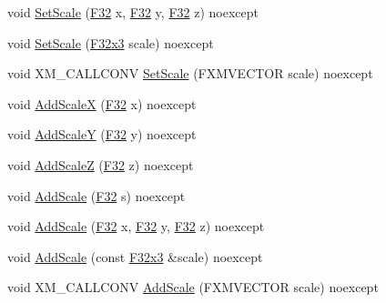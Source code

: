 \begin{DoxyCompactItemize}
\item 
void \mbox{\hyperlink{classmage_1_1_s_q_t_transform3_d_a7d2c670087bb8e7eb54ab6e08e36ea9d}{Set\+Scale}} (\mbox{\hyperlink{namespacemage_aa97e833b45f06d60a0a9c4fc22ae02c0}{F32}} x, \mbox{\hyperlink{namespacemage_aa97e833b45f06d60a0a9c4fc22ae02c0}{F32}} y, \mbox{\hyperlink{namespacemage_aa97e833b45f06d60a0a9c4fc22ae02c0}{F32}} z) noexcept
\item 
void \mbox{\hyperlink{classmage_1_1_s_q_t_transform3_d_ab5f2b6c45c653c376f88968f2fe1aeb0}{Set\+Scale}} (\mbox{\hyperlink{namespacemage_a1e3c7a882af461f161caa1cbddaf1fa2}{F32x3}} scale) noexcept
\item 
void X\+M\+\_\+\+C\+A\+L\+L\+C\+O\+NV \mbox{\hyperlink{classmage_1_1_s_q_t_transform3_d_aa66a0de13a87880e5eafb2999ada9cf1}{Set\+Scale}} (F\+X\+M\+V\+E\+C\+T\+OR scale) noexcept
\item 
void \mbox{\hyperlink{classmage_1_1_s_q_t_transform3_d_a641e3b596cc6e0f82fe75a2c22930557}{Add\+ScaleX}} (\mbox{\hyperlink{namespacemage_aa97e833b45f06d60a0a9c4fc22ae02c0}{F32}} x) noexcept
\item 
void \mbox{\hyperlink{classmage_1_1_s_q_t_transform3_d_a2582d5c8223077d9d09af87e80b944e3}{Add\+ScaleY}} (\mbox{\hyperlink{namespacemage_aa97e833b45f06d60a0a9c4fc22ae02c0}{F32}} y) noexcept
\item 
void \mbox{\hyperlink{classmage_1_1_s_q_t_transform3_d_a57302a68398cb2f29509029b807a9943}{Add\+ScaleZ}} (\mbox{\hyperlink{namespacemage_aa97e833b45f06d60a0a9c4fc22ae02c0}{F32}} z) noexcept
\item 
void \mbox{\hyperlink{classmage_1_1_s_q_t_transform3_d_a15234f33c977b95ace087c5c31ebcd56}{Add\+Scale}} (\mbox{\hyperlink{namespacemage_aa97e833b45f06d60a0a9c4fc22ae02c0}{F32}} s) noexcept
\item 
void \mbox{\hyperlink{classmage_1_1_s_q_t_transform3_d_abe17a512e63eb5382dd6ed7c9cf6a7ff}{Add\+Scale}} (\mbox{\hyperlink{namespacemage_aa97e833b45f06d60a0a9c4fc22ae02c0}{F32}} x, \mbox{\hyperlink{namespacemage_aa97e833b45f06d60a0a9c4fc22ae02c0}{F32}} y, \mbox{\hyperlink{namespacemage_aa97e833b45f06d60a0a9c4fc22ae02c0}{F32}} z) noexcept
\item 
void \mbox{\hyperlink{classmage_1_1_s_q_t_transform3_d_aacc140df49a4fe21d91cc768fedeafb3}{Add\+Scale}} (const \mbox{\hyperlink{namespacemage_a1e3c7a882af461f161caa1cbddaf1fa2}{F32x3}} \&scale) noexcept
\item 
void X\+M\+\_\+\+C\+A\+L\+L\+C\+O\+NV \mbox{\hyperlink{classmage_1_1_s_q_t_transform3_d_a0b1397f6ba5721f69b70cdf8034d8226}{Add\+Scale}} (F\+X\+M\+V\+E\+C\+T\+OR scale) noexcept

\end{DoxyCompactItemize}
